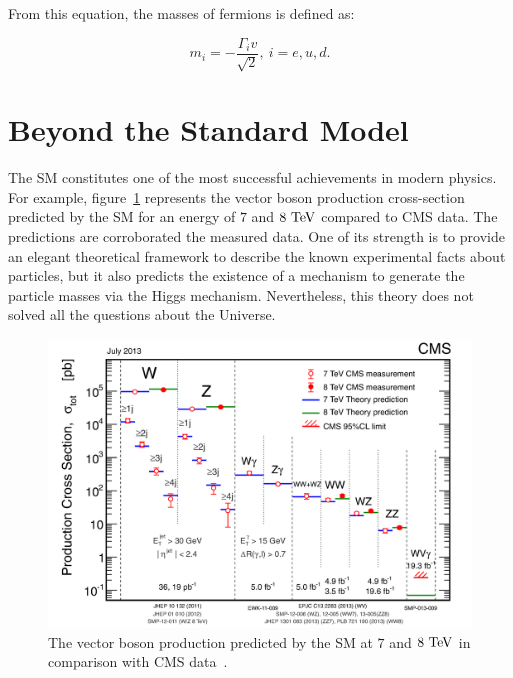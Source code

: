       From this equation, the masses of fermions is defined as:

      \begin{equation}
        m_{i} = - \frac{\Gamma_{i} v}{\sqrt{2}},~i = e, u, d.
      \end{equation}


  \section{Beyond the Standard Model}

  The \gls{SM} constitutes one of the most successful achievements in modern physics.
  For example, figure~\ref{fig:SMvalidation} represents the vector boson production cross-section predicted by the \gls{SM} for an energy of $7$ and $8~\rm{TeV}$ compared to CMS data.
  The predictions are corroborated the measured data.
  One of its strength is to provide an elegant theoretical framework to describe the known experimental facts about particles, but it also predicts the existence of a mechanism to generate the particle masses via the Higgs mechanism.
  Nevertheless, this theory does not solved all the questions about the Universe.

  \begin{figure}[!h]
    \centering
    \includegraphics[width = \textwidth]{Pictures/SM/productionXsectionSMvsCMS.png}
    \caption{The vector boson production predicted by the SM at $7$ and $8~\rm{TeV}$ in comparison with CMS data~\cite{deBoer:2013pud}.}
    \label{fig:SMvalidation}
  \end{figure}
  
